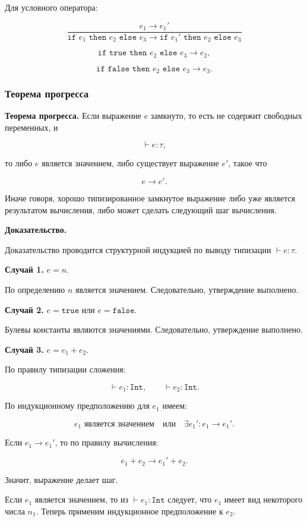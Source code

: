 \documentclass[12pt,a4paper]{article}
\begin{document}
Для условного оператора:

\[
\frac{e_1 \to e_1'}
{\texttt{if } e_1 \texttt{ then } e_2 \texttt{ else } e_3
\to
\texttt{if } e_1' \texttt{ then } e_2 \texttt{ else } e_3}
\]

\[
\texttt{if true then } e_2 \texttt{ else } e_3 \to e_2,
\]

\[
\texttt{if false then } e_2 \texttt{ else } e_3 \to e_3.
\]

\subsubsection{Теорема прогресса}

\textbf{Теорема прогресса.}
Если выражение \(e\) замкнуто, то есть не содержит свободных переменных, и

\[
\vdash e : \tau,
\]

то либо \(e\) является значением, либо существует выражение \(e'\), такое что

\[
e \to e'.
\]

Иначе говоря, хорошо типизированное замкнутое выражение либо уже является
результатом вычисления, либо может сделать следующий шаг вычисления.

\textbf{Доказательство.}

Доказательство проводится структурной индукцией по выводу типизации
\(\vdash e : \tau\).

\textbf{Случай 1.} \(e = n\).

По определению \(n\) является значением. Следовательно, утверждение выполнено.

\textbf{Случай 2.} \(e = \texttt{true}\) или \(e = \texttt{false}\).

Булевы константы являются значениями. Следовательно, утверждение выполнено.

\textbf{Случай 3.} \(e = e_1 + e_2\).

По правилу типизации сложения:

\[
\vdash e_1 : \texttt{Int},
\qquad
\vdash e_2 : \texttt{Int}.
\]

По индукционному предположению для \(e_1\) имеем:

\[
e_1 \text{ является значением}
\quad \text{или} \quad
\exists e_1' : e_1 \to e_1'.
\]

Если \(e_1 \to e_1'\), то по правилу вычисления:

\[
e_1 + e_2 \to e_1' + e_2.
\]

Значит, выражение делает шаг.

Если \(e_1\) является значением, то из \(\vdash e_1 : \texttt{Int}\) следует, что
\(e_1\) имеет вид некоторого числа \(n_1\). Теперь применим индукционное предположение
к \(e_2\).
\end{document}
